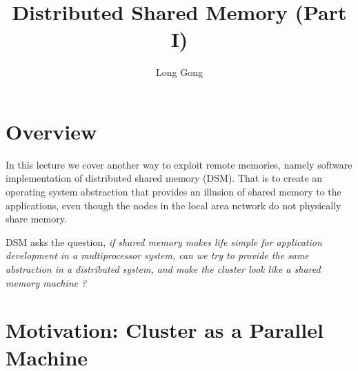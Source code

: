 \documentclass[11pt]{lecture}
\begin{document}
\title{Distributed Shared Memory (Part I)}%
\author{Long Gong}
\maketitle

\section{Overview}

In this lecture we cover another way to exploit remote memories, namely 
software implementation of distributed shared memory (DSM). That is to create 
an operating system abstraction that provides an illusion of shared memory 
to the applications, even though the nodes in the local area network do not 
physically share memory. 

DSM asks the question, {\it if shared memory makes life simple for application 
development in a multiprocessor system, can we try to provide the same abstraction 
in a distributed system, and make the cluster look like a shared memory machine ?} 


\section{Motivation: Cluster as a Parallel Machine}\label{sec: motivation}
\end{document}
